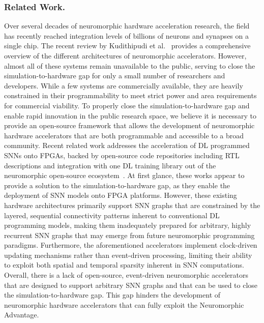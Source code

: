 \subsubsection{Related Work.}
Over several decades of neuromorphic hardware acceleration research, the field has recently reached integration levels of billions of neurons and synapses on a single chip. The recent review by Kudithipudi et al.~\cite{kudithipudi_neuromorphic_2025} provides a comprehensive overview of the different architectures of neuromorphic accelerators. However, almost all of these systems remain unavailable to the public, serving to close the simulation-to-hardware gap for only a small number of researchers and developers. While a few systems are commercially available, they are heavily constrained in their programmability to meet strict power and area requirements for commercial viability. To properly close the simulation-to-hardware gap and enable rapid innovation in the public research space, we believe it is necessary to provide an open-source framework that allows the development of neuromorphic hardware accelerators that are both programmable and accessible to a broad community.
Recent related work addresses the acceleration of \ac{DL} programmed \acp{SNN} onto \acp{FPGA}, backed by open-source code repositories including \ac{RTL} descriptions and integration with one \ac{DL} training library out of the neuromorphic open-source ecosystem~\cite{leone_syntzulu_2025,carpegna_spiker_2024,saulquin_modnef_2025}.
At first glance, these works appear to provide a solution to the simulation-to-hardware gap, as they enable the deployment of \ac{SNN} models onto \ac{FPGA} platforms. However, these existing hardware architectures primarily support \ac{SNN} graphs that are constrained by the layered, sequential connectivity patterns inherent to conventional \ac{DL} programming models, making them inadequately prepared for arbitrary, highly recurrent \ac{SNN} graphs that may emerge from future neuromorphic programming paradigms. Furthermore, the aforementioned accelerators implement clock-driven updating mechanisms rather than event-driven processing, limiting their ability to exploit both spatial and temporal sparsity inherent in \ac{SNN} computations.
Overall, there is a lack of open-source, event-driven neuromorphic accelerators that are designed to support arbitrary \ac{SNN} graphs and that can be used to close the simulation-to-hardware gap. This gap hinders the development of neuromorphic hardware accelerators that can fully exploit the Neuromorphic Advantage.

